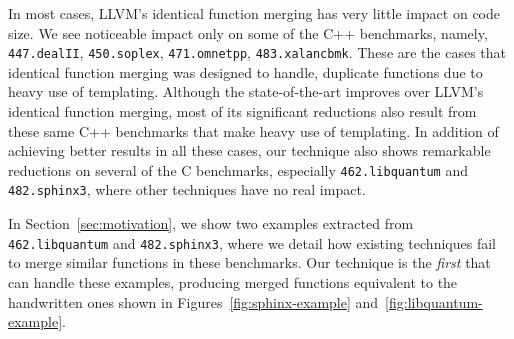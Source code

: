 In most cases, LLVM's identical function merging has very little impact on code
size.
We see noticeable impact only on some of the C++ benchmarks, namely,
\texttt{447.dealII}, \texttt{450.soplex}, \texttt{471.omnetpp}, \texttt{483.xalancbmk}.
These are the cases that identical function merging was designed to handle,
duplicate functions due to heavy use of templating.
Although the state-of-the-art improves over LLVM's identical function merging,
most of its significant reductions also result from these same C++ benchmarks
that make heavy use of templating.
In addition of achieving better results in all these cases, our technique
also shows remarkable reductions on several of the
C benchmarks, especially \texttt{462.libquantum} and \texttt{482.sphinx3}, where
other techniques have no real impact.


In Section~\ref{sec:motivation}, we show two examples extracted from
\texttt{462.libquantum} and \texttt{482.sphinx3}, where we detail how existing
techniques fail to merge similar functions in these benchmarks.
Our technique is the \textit{first} that can handle these examples, producing
merged functions equivalent to the handwritten ones shown in
Figures~\ref{fig:sphinx-example} and~\ref{fig:libquantum-example}.


